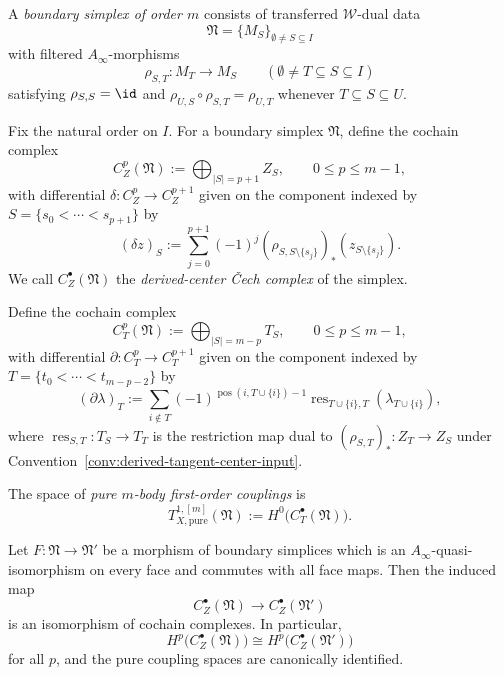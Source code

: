 \begin{definition}
\label{def:w-boundary-simplex}
A \emph{boundary simplex of order $m$} consists of transferred $\mathcal W$-dual data
\[
\mathfrak N=\{M_S\}_{\emptyset\neq S\subseteq I}
\]
with filtered $A_\infty$-morphisms
\[
\rho_{S,T}\colon M_T\longrightarrow M_S
\qquad (\emptyset\neq T\subseteq S\subseteq I)
\]
satisfying $\rho_{S,S}=\id$ and $\rho_{U,S}\circ \rho_{S,T}=\rho_{U,T}$ whenever
$T\subseteq S\subseteq U$.
\end{definition}

\begin{definition}
\label{def:w-derived-center-cech}
Fix the natural order on $I$.  For a boundary simplex $\mathfrak N$, define the cochain complex
\[
C_Z^p(\mathfrak N):=\bigoplus_{|S|=p+1} Z_S,
\qquad 0\le p\le m-1,
\]
with differential $\delta\colon C_Z^p\to C_Z^{p+1}$ given on the component indexed by
$S=\{s_0<\cdots<s_{p+1}\}$ by
\[
(\delta z)_S
:=
\sum_{j=0}^{p+1}(-1)^j (\rho_{S,S\setminus\{s_j\}})_*(z_{S\setminus\{s_j\}}).
\]
We call $C_Z^\bullet(\mathfrak N)$ the \emph{derived-center \v{C}ech complex} of the simplex.
\end{definition}

\begin{definition}
\label{def:w-tangent-restriction-complex}
Define the cochain complex
\[
C_T^p(\mathfrak N):=\bigoplus_{|S|=m-p} T_S,
\qquad 0\le p\le m-1,
\]
with differential $\partial\colon C_T^p\to C_T^{p+1}$ given on the component indexed by
$T=\{t_0<\cdots<t_{m-p-2}\}$ by
\[
(\partial\lambda)_T
:=
\sum_{i\notin T}(-1)^{\operatorname{pos}(i,T\cup\{i\})-1}
\operatorname{res}_{T\cup\{i\},T}(\lambda_{T\cup\{i\}}),
\]
where $\operatorname{res}_{S,T}\colon T_S\to T_T$ is the restriction map dual to
$(\rho_{S,T})_*\colon Z_T\to Z_S$ under Convention~\ref{conv:derived-tangent-center-input}.

The space of \emph{pure $m$-body first-order couplings} is
\[
T^{1,[m]}_{X,\mathrm{pure}}(\mathfrak N):=H^0\bigl(C_T^\bullet(\mathfrak N)\bigr).
\]
\end{definition}

\begin{lemma}
\label{lem:w-boundary-simplex-homotopy-invariance}
Let $F\colon \mathfrak N\to \mathfrak N'$ be a morphism of boundary simplices which is an
$A_\infty$-quasi-isomorphism on every face and commutes with all face maps.  Then the induced map
\[
C_Z^\bullet(\mathfrak N)\longrightarrow C_Z^\bullet(\mathfrak N')
\]
is an isomorphism of cochain complexes.  In particular,
\[
H^p\bigl(C_Z^\bullet(\mathfrak N)\bigr)
\cong
H^p\bigl(C_Z^\bullet(\mathfrak N')\bigr)
\]
for all $p$, and the pure coupling spaces are canonically identified.
\end{lemma}

